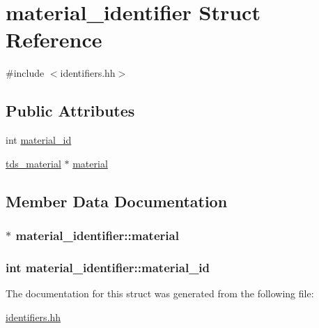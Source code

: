 \hypertarget{structmaterial__identifier}{\section{material\-\_\-identifier Struct Reference}
\label{structmaterial__identifier}
}


{\ttfamily \#include $<$identifiers.\-hh$>$}

\subsection*{Public Attributes}
\begin{DoxyCompactItemize}
\item 
int \hyperlink{structmaterial__identifier_a0a78177622843fe4acef33c396737e03}{material\-\_\-id}
\item 
\hyperlink{classtds__material}{tds\-\_\-material} $\ast$ \hyperlink{structmaterial__identifier_a7721b745f0f7d8f365d0b38144e115eb}{material}
\end{DoxyCompactItemize}


\subsection{Member Data Documentation}
\hypertarget{structmaterial__identifier_a7721b745f0f7d8f365d0b38144e115eb}{
\subsubsection[{material}]{$\ast$ material\-\_\-identifier\-::material}}\label{structmaterial__identifier_a7721b745f0f7d8f365d0b38144e115eb}
\hypertarget{structmaterial__identifier_a0a78177622843fe4acef33c396737e03}{
\subsubsection[{material\-\_\-id}]{\setlength{\rightskip}{0pt plus 5cm}int material\-\_\-identifier\-::material\-\_\-id}}\label{structmaterial__identifier_a0a78177622843fe4acef33c396737e03}


The documentation for this struct was generated from the following file\-:\begin{DoxyCompactItemize}
\item 
\hyperlink{identifiers_8hh}{identifiers.\-hh}\end{DoxyCompactItemize}
